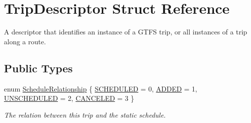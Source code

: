 \hypertarget{structTripDescriptor}{}\section{Trip\+Descriptor Struct Reference}
\label{structTripDescriptor}


A descriptor that identifies an instance of a G\+T\+FS trip, or all instances of a trip along a route.  


\subsection*{Public Types}
\begin{DoxyCompactItemize}
\item 
enum \hyperlink{structTripDescriptor_a3edbca669de2c1c3350403537b24a26e}{Schedule\+Relationship} \{ \hyperlink{structTripDescriptor_a3edbca669de2c1c3350403537b24a26eabb46adf5d175229c9233128f5c91cc9a}{S\+C\+H\+E\+D\+U\+L\+ED} = 0, 
\hyperlink{structTripDescriptor_a3edbca669de2c1c3350403537b24a26ea4a2d9e2e7fc1c6fe3e0c04bdb9f87d21}{A\+D\+D\+ED} = 1, 
\hyperlink{structTripDescriptor_a3edbca669de2c1c3350403537b24a26ea63eb6ab0096e0964d2ddef7b08885894}{U\+N\+S\+C\+H\+E\+D\+U\+L\+ED} = 2, 
\hyperlink{structTripDescriptor_a3edbca669de2c1c3350403537b24a26ea39252ba762feeb4e8a9b464d00a5973d}{C\+A\+N\+C\+E\+L\+ED} = 3
 \}\begin{DoxyCompactList}\small\item\em The relation between this trip and the static schedule. \end{DoxyCompactList}
\end{DoxyCompactItemize}
